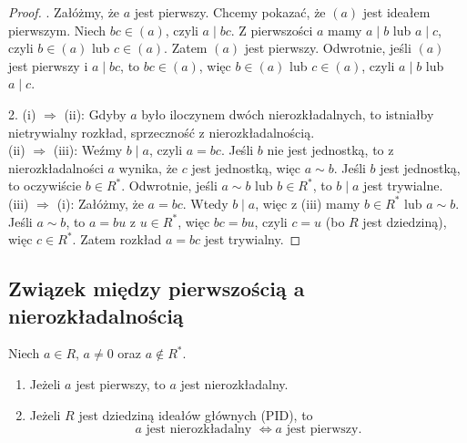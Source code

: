 \begin{proof}
. Załóżmy, że $a$ jest pierwszy. Chcemy pokazać, że $(a)$ jest ideałem pierwszym. Niech $bc \in (a)$, czyli $a \mid bc$. Z pierwszości $a$ mamy $a \mid b$ lub $a \mid c$, czyli $b \in (a)$ lub $c \in (a)$. Zatem $(a)$ jest pierwszy. Odwrotnie, jeśli $(a)$ jest pierwszy i $a \mid bc$, to $bc \in (a)$, więc $b \in (a)$ lub $c \in (a)$, czyli $a \mid b$ lub $a \mid c$.

2. (i) $\Rightarrow$ (ii): Gdyby $a$ było iloczynem dwóch nierozkładalnych, to istniałby nietrywialny rozkład, sprzeczność z nierozkładalnością. \\
(ii) $\Rightarrow$ (iii): Weźmy $b \mid a$, czyli $a = bc$. Jeśli $b$ nie jest jednostką, to z nierozkładalności $a$ wynika, że $c$ jest jednostką, więc $a \sim b$. Jeśli $b$ jest jednostką, to oczywiście $b \in R^*$. Odwrotnie, jeśli $a \sim b$ lub $b \in R^*$, to $b \mid a$ jest trywialne. \\
(iii) $\Rightarrow$ (i): Załóżmy, że $a = bc$. Wtedy $b \mid a$, więc z (iii) mamy $b \in R^*$ lub $a \sim b$. Jeśli $a \sim b$, to $a = bu$ z $u \in R^*$, więc $bc = bu$, czyli $c = u$ (bo $R$ jest dziedziną), więc $c \in R^*$. Zatem rozkład $a = bc$ jest trywialny.
\end{proof}

\subsection*{Związek między pierwszością a nierozkładalnością}

\begin{theorem}
Niech $a \in R$, $a \neq 0$ oraz $a \notin R^*$.
\begin{enumerate}[label=\arabic*)]
    \item Jeżeli $a$ jest pierwszy, to $a$ jest nierozkładalny.
    \item Jeżeli $R$ jest dziedziną ideałów głównych (PID), to
	    \[
	    a \text{ jest nierozkładalny } \iff a \text{ jest pierwszy}
	    .\] 
\end{enumerate}
\end{theorem}

